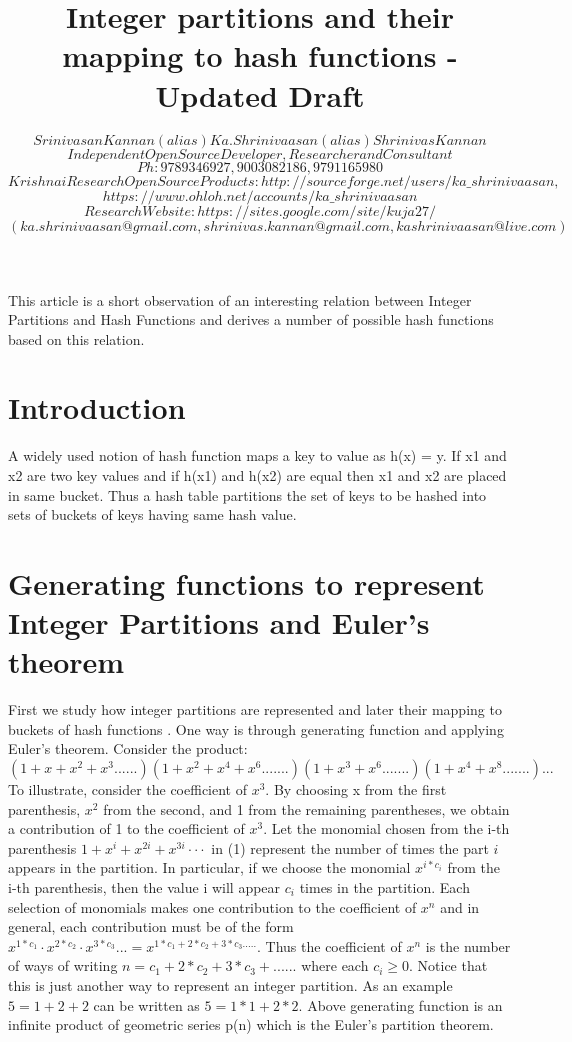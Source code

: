 \documentclass[11pt,onecolumn]{article}
\author{ $Srinivasan Kannan (alias) Ka.Shrinivaasan (alias) Shrinivas Kannan$ \\
$Independent Open Source Developer, Researcher and Consultant$ \\
$Ph: 9789346927, 9003082186, 9791165980$ \\
$Krishna iResearch OpenSource Products: http://sourceforge.net/users/ka\_shrinivaasan,$ \\ $https://www.ohloh.net/accounts/ka\_shrinivaasan$ \\
$Research Website: https://sites.google.com/site/kuja27/$ \\
$(ka.shrinivaasan@gmail.com, shrinivas.kannan@gmail.com, kashrinivaasan@live.com)$ 
}
\title{Integer partitions and their mapping to hash functions - Updated Draft}
\begin{document}
\thispagestyle{empty}
\pagestyle{empty}
\maketitle
\begin{onecolabstract}
This article is a short observation of an interesting relation between Integer Partitions and Hash  Functions and derives a number of possible hash functions based on this relation.
\end{onecolabstract}

\section {Introduction}

A widely used notion of hash function maps a key to value as h(x) = y. If x1  and x2 are two key values and if h(x1) and h(x2) are equal then x1 and x2 are placed in same bucket. Thus a hash table partitions the set of keys to be hashed into sets of buckets of keys having same hash value.  


\section {Generating functions to represent Integer Partitions and Euler's theorem}

First we study how integer partitions are represented and later their mapping to buckets of hash functions . One way is through generating function and applying Euler's theorem. Consider the product: 
\begin{equation}
(1 + x + x^2 + x^3 ...... )(1 + x^2 + x^4 + x^6 .......)(1 + x^3 + x^6 .......)(1 + x^4 + x^8 .......)...
\end{equation}
To illustrate, consider the coefficient of $x^3$. By choosing x from the first parenthesis, $x^2$ from the second, and 1 from the remaining parentheses, we obtain a contribution of 1 to the coefficient of $x^3$. Let the monomial chosen from the i-th parenthesis $1+x^{i}+x^{2i}+x^{3i} · · ·$ in (1) represent the number of times the part $i$ appears in the partition. In particular, if we choose the monomial $x^{i*c_{i}}$ from the i-th parenthesis, then the value i will appear $c_{i}$ times in the partition. Each selection of monomials makes one contribution to the coefficient of $x^n$ and in general, each contribution must be of the form $x^{1*c_{1}} · x^{2*c_{2}} · x^{3*c_{3}} ... = x^{1*c_{1}+2*c_{2}+3*c_{3}.....}$. Thus the coefficient of $x^n$ is the number of ways of writing $n = c_{1} + 2*c_{2} + 3*c_{3} + ......$ where each $c_{i} \geq 0$. Notice that this is just another way to represent an integer partition. As an example $5=1+2+2$ can be written as $5 = 1*1 + 2*2$. Above generating function is an infinite product of geometric series p(n) which is the Euler's partition theorem. 
\end{document}
